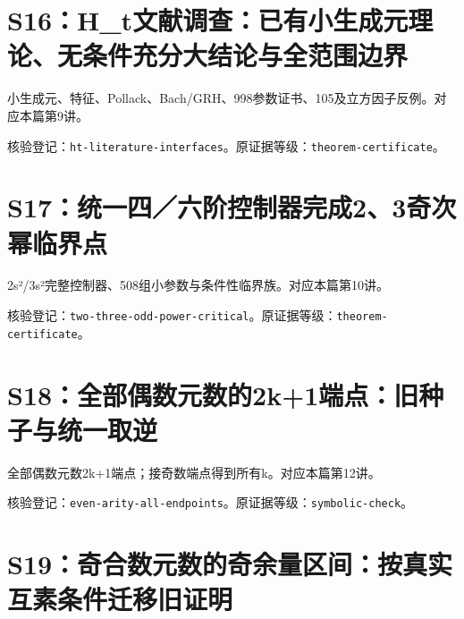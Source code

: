 \section{S16：H\_t文献调查：已有小生成元理论、无条件充分大结论与全范围边界}\label{source:S16}

小生成元、特征、Pollack、Bach/GRH、998参数证书、105及立方因子反例。对应本篇第9讲。

\par{}\par

核验登记：{\small\nolinkurl{ht-literature-interfaces}}。原证据等级：{\small\nolinkurl{theorem-certificate}}。

\section{S17：统一四／六阶控制器完成2、3奇次幂临界点}\label{source:S17}

2s²/3s²完整控制器、508组小参数与条件性临界族。对应本篇第10讲。

\par{}\par

核验登记：{\small\nolinkurl{two-three-odd-power-critical}}。原证据等级：{\small\nolinkurl{theorem-certificate}}。

\section{S18：全部偶数元数的2k+1端点：旧种子与统一取逆}\label{source:S18}

全部偶数元数2k+1端点；接奇数端点得到所有k。对应本篇第12讲。

\par{}\par

核验登记：{\small\nolinkurl{even-arity-all-endpoints}}。原证据等级：{\small\nolinkurl{symbolic-check}}。

\section{S19：奇合数元数的奇余量区间：按真实互素条件迁移旧证明}\label{source:S19}

